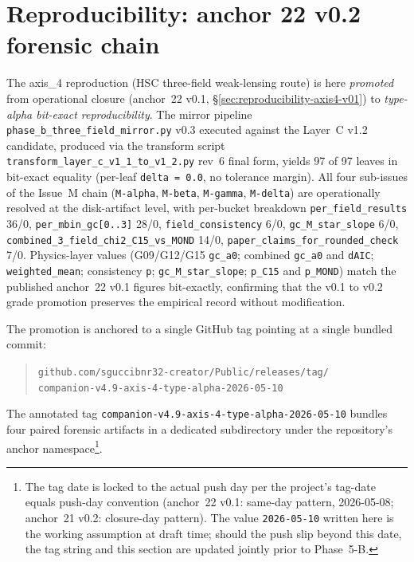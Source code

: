 \documentclass[11pt,a4paper]{ltjsarticle}
\begin{document}

\section*{Reproducibility: anchor 22 v0.2 forensic chain}
\label{sec:reproducibility-axis4-v02-type-alpha}

The axis\_4 reproduction (HSC three-field weak-lensing route) is here
\emph{promoted} from operational closure (anchor~22 v0.1,
\S\ref{sec:reproducibility-axis4-v01}) to \emph{type-alpha bit-exact
reproducibility}. The mirror pipeline
\texttt{phase\_b\_three\_field\_mirror.py} v0.3 executed against the
Layer~C v1.2 candidate, produced via the transform script
\texttt{transform\_layer\_c\_v1\_1\_to\_v1\_2.py} rev~6 final form,
yields 97 of 97 leaves in bit-exact equality (per-leaf
\texttt{delta = 0.0}, no tolerance margin). All four sub-issues of the
Issue~M chain (\texttt{M-alpha}, \texttt{M-beta}, \texttt{M-gamma},
\texttt{M-delta}) are operationally resolved at the disk-artifact
level, with per-bucket breakdown \texttt{per\_field\_results} 36/0,
\texttt{per\_mbin\_gc[0..3]} 28/0, \texttt{field\_consistency} 6/0,
\texttt{gc\_M\_star\_slope} 6/0,
\texttt{combined\_3\_field\_chi2\_C15\_vs\_MOND} 14/0,
\texttt{paper\_claims\_for\_rounded\_check} 7/0. Physics-layer values
(G09/G12/G15 \texttt{gc\_a0}; combined \texttt{gc\_a0} and
\texttt{dAIC}; \texttt{weighted\_mean}; consistency \texttt{p};
\texttt{gc\_M\_star\_slope}; \texttt{p\_C15} and \texttt{p\_MOND})
match the published anchor~22 v0.1 figures bit-exactly, confirming
that the v0.1 to v0.2 grade promotion preserves the empirical record
without modification.

The promotion is anchored to a single GitHub tag pointing at a single
bundled commit:
\begin{quote}
\texttt{github.com/sguccibnr32-creator/Public/releases/tag/}\\
\texttt{companion-v4.9-axis-4-type-alpha-2026-05-10}
\end{quote}

The annotated tag \texttt{companion-v4.9-axis-4-type-alpha-2026-05-10}
bundles four paired forensic artifacts in a dedicated subdirectory
under the repository's anchor namespace\footnote{The tag date is
locked to the actual push day per the project's tag-date equals
push-day convention (anchor~22 v0.1: same-day pattern, 2026-05-08;
anchor~21 v0.2: closure-day pattern). The value
\texttt{2026-05-10} written here is the working assumption at draft
time; should the push slip beyond this date, the tag string and this
section are updated jointly prior to Phase~5-B.}.
\end{document}
